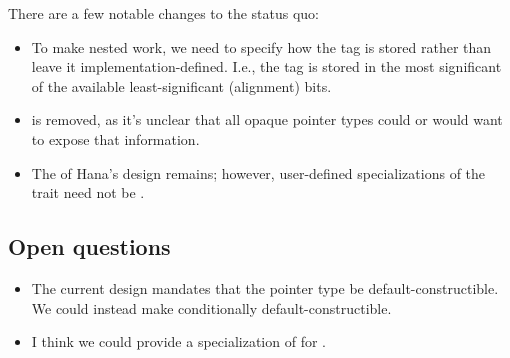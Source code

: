 \documentclass{wg21}
\begin{document}
There are a few notable changes to the status quo:

\begin{itemize}
\item To make nested  work, we need to specify how the tag is stored rather than leave it implementation-defined.
  I.e., the tag is stored in the most significant of the available least-significant (alignment) bits.

\begin{figure}[htbp]
    \centering
\end{figure}

\item {} is removed, as it's unclear that all opaque pointer types could or would want to expose that information.

\item The  of Hana's design remains; however, user-defined specializations of the trait need not be .

\end{itemize}

\subsection{Open questions}

\begin{itemize}
\item The current design mandates that the pointer type be default-constructible. We could instead make  conditionally
default-constructible.

\item I think we could provide a specialization of  for .

\end{itemize}
\end{document}
